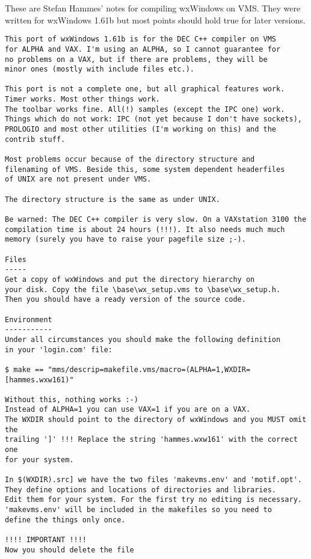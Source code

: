 These are Stefan Hammes' notes for compiling wxWindows on VMS.
They were written for wxWindows 1.61b but most points should hold true for later
versions.

\begin{verbatim}
This port of wxWindows 1.61b is for the DEC C++ compiler on VMS 
for ALPHA and VAX. I'm using an ALPHA, so I cannot guarantee for 
no problems on a VAX, but if there are problems, they will be 
minor ones (mostly with include files etc.).

This port is not a complete one, but all graphical features work.
Timer works. Most other things work. 
The toolbar works fine. All(!) samples (except the IPC one) work.
Things which do not work: IPC (not yet because I don't have sockets),
PROLOGIO and most other utilities (I'm working on this) and the 
contrib stuff.

Most problems occur because of the directory structure and
filenaming of VMS. Beside this, some system dependent headerfiles
of UNIX are not present under VMS.

The directory structure is the same as under UNIX.

Be warned: The DEC C++ compiler is very slow. On a VAXstation 3100 the
compilation time is about 24 hours (!!!). It also needs much much 
memory (surely you have to raise your pagefile size ;-).

Files
-----
Get a copy of wxWindows and put the directory hierarchy on
your disk. Copy the file \base\wx_setup.vms to \base\wx_setup.h.
Then you should have a ready version of the source code. 

Environment
-----------
Under all circumstances you should make the following definition
in your 'login.com' file:

$ make == "mms/descrip=makefile.vms/macro=(ALPHA=1,WXDIR=[hammes.wxw161)"

Without this, nothing works :-)
Instead of ALPHA=1 you can use VAX=1 if you are on a VAX.
The WXDIR should point to the directory of wxWindows and you MUST omit the
trailing ']' !!! Replace the string 'hammes.wxw161' with the correct one
for your system.

In $(WXDIR).src] we have the two files 'makevms.env' and 'motif.opt'. 
They define options and locations of directories and libraries. 
Edit them for your system. For the first try no editing is necessary.
'makevms.env' will be included in the makefiles so you need to
define the things only once.

!!!! IMPORTANT !!!!
Now you should delete the file 


\end{verbatim}
